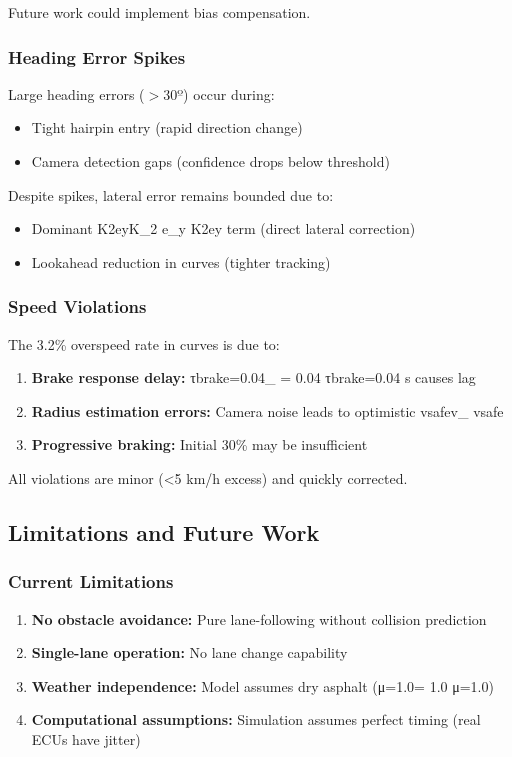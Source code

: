 \documentclass[12pt]{article}
\begin{document}
Future work could implement bias compensation.
\subsubsection{Heading Error Spikes}
Large heading errors ($>30º$) occur during:
\begin{itemize}
    \item Tight hairpin entry (rapid direction change)
    \item Camera detection gaps (confidence drops below threshold)
\end{itemize}

Despite spikes, lateral error remains bounded due to:
\begin{itemize}
    \item Dominant K2eyK_2 e_y
K2​ey​ term (direct lateral correction)
    \item Lookahead reduction in curves (tighter tracking)
\end{itemize}

\subsubsection{Speed Violations}
The 3.2\% overspeed rate in curves is due to:
\begin{enumerate}
    \item \textbf{Brake response delay:} τbrake=0.04\tau_{} = 0.04
τbrake​=0.04 s causes lag
    \item \textbf{Radius estimation errors:} Camera noise leads to optimistic vsafev_{}
vsafe​    \item \textbf{Progressive braking:} Initial 30\% may be insufficient
\end{enumerate}

All violations are minor (<5 km/h excess) and quickly corrected.
\subsection{Limitations and Future Work}
\subsubsection{Current Limitations}
\begin{enumerate}
    \item \textbf{No obstacle avoidance:} Pure lane-following without collision prediction
    \item \textbf{Single-lane operation:} No lane change capability
    \item \textbf{Weather independence:} Model assumes dry asphalt (μ=1.0\mu = 1.0
μ=1.0)
    \item \textbf{Computational assumptions:} Simulation assumes perfect timing (real ECUs have jitter)
\end{enumerate}
\end{document}
